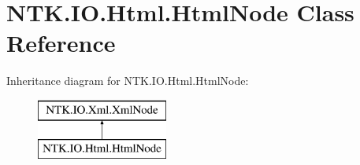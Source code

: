 \hypertarget{class_n_t_k_1_1_i_o_1_1_html_1_1_html_node}{}\section{N\+T\+K.\+I\+O.\+Html.\+Html\+Node Class Reference}
\label{class_n_t_k_1_1_i_o_1_1_html_1_1_html_node}


 


Inheritance diagram for N\+T\+K.\+I\+O.\+Html.\+Html\+Node\+:\begin{figure}[H]
\begin{center}
\leavevmode
\includegraphics[height=2.000000cm]{d8/da5/class_n_t_k_1_1_i_o_1_1_html_1_1_html_node}
\end{center}
\end{figure}
